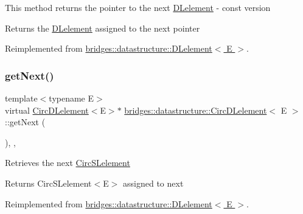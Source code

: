 This method returns the pointer to the next \hyperlink{classbridges_1_1datastructure_1_1_d_lelement}{D\+Lelement} -\/ const version \begin{DoxyReturn}{Returns}
the \hyperlink{classbridges_1_1datastructure_1_1_d_lelement}{D\+Lelement} assigned to the next pointer 
\end{DoxyReturn}


Reimplemented from \hyperlink{classbridges_1_1datastructure_1_1_d_lelement_a8599e5be5fc1771d4e8a40f6de67b4a7}{bridges\+::datastructure\+::\+D\+Lelement$<$ E $>$}.

\mbox{\label{classbridges_1_1datastructure_1_1_circ_d_lelement_a80681d0382643a6df21da1bec4067004}} 
\subsubsection{\texorpdfstring{get\+Next()}{getNext()}\hspace{0.1cm}{\footnotesize\ttfamily [2/2]}}
{\footnotesize\ttfamily template$<$typename E$>$ \\
virtual \hyperlink{classbridges_1_1datastructure_1_1_circ_d_lelement}{Circ\+D\+Lelement}$<$E$>$$\ast$ \hyperlink{classbridges_1_1datastructure_1_1_circ_d_lelement}{bridges\+::datastructure\+::\+Circ\+D\+Lelement}$<$ E $>$\+::get\+Next (\begin{DoxyParamCaption}{ }\end{DoxyParamCaption})\hspace{0.3cm}{\ttfamily [inline]}, {\ttfamily [override]}, {\ttfamily [virtual]}}

Retrieves the next \hyperlink{classbridges_1_1datastructure_1_1_circ_s_lelement}{Circ\+S\+Lelement} \begin{DoxyReturn}{Returns}
Circ\+S\+Lelement$<$\+E$>$ assigned to next 
\end{DoxyReturn}


Reimplemented from \hyperlink{classbridges_1_1datastructure_1_1_d_lelement_a63212051ea77d74bd751dea00288d2be}{bridges\+::datastructure\+::\+D\+Lelement$<$ E $>$}.

\mbox{\label{classbridges_1_1datastructure_1_1_circ_d_lelement_a5218bb590a588e1d1aaa8f53403ed0cb}} 
